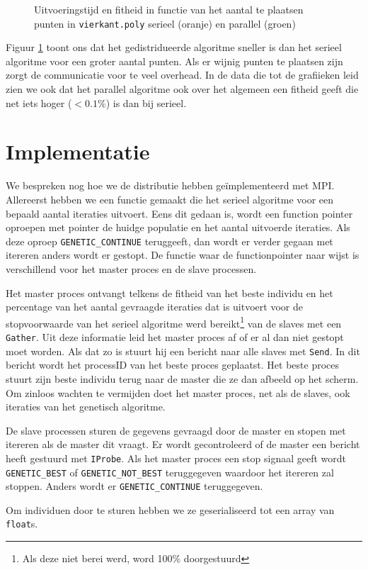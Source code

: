 \begin{figure}[H]

\caption{Uitvoeringstijd en fitheid in functie van het aantal te plaatsen punten in \texttt{vierkant.poly} serieel (oranje) en parallel (groen)}
\label{graf:perf}
\end{figure}

Figuur \ref{graf:perf} toont ons dat het gedistridueerde algoritme sneller is dan het serieel algoritme voor een groter aantal punten. Als er wijnig punten te plaatsen zijn zorgt de communicatie voor te veel overhead. In de data die tot de grafiieken leid zien we ook dat het parallel algoritme ook over het algemeen een fitheid geeft die net iets hoger ($< 0.1\%$) is dan bij serieel.


\section{Implementatie}
We bespreken nog hoe we de distributie hebben geïmplementeerd met MPI. Allereerst hebben we een functie gemaakt die het serieel algoritme voor een bepaald aantal iteraties uitvoert. Eens dit gedaan is, wordt een function pointer oproepen met pointer de huidge populatie en het aantal uitvoerde iteraties. Als deze oproep \texttt{GENETIC\_CONTINUE} teruggeeft, dan wordt er verder gegaan met itereren anders wordt er gestopt. De functie waar de functionpointer naar wijst is verschillend voor het master proces en de slave processen. 

Het master proces ontvangt telkens de fitheid van het beste individu en het percentage van het aantal gevraagde iteraties dat is uitvoert voor de stopvoorwaarde van het serieel algoritme werd bereikt\footnote{Als deze niet berei werd, word 100\% doorgestuurd} van de slaves met een \texttt{Gather}. Uit deze informatie leid het master proces af of er al dan niet gestopt moet worden. Als dat zo is stuurt hij een bericht naar alle slaves met \texttt{Send}. In dit bericht wordt het processID van het beste proces geplaatst. Het beste proces stuurt zijn beste individu terug naar de master die ze dan afbeeld op het scherm. Om zinloos wachten te vermijden doet het master proces, net als de slaves, ook iteraties van het genetisch algoritme.

De slave processen sturen de gegevens gevraagd door de master en stopen met itereren als de master dit vraagt. Er wordt gecontroleerd of de master een bericht heeft gestuurd met \texttt{IProbe}. Als het master proces een stop signaal geeft wordt \texttt{GENETIC\_BEST} of \texttt{GENETIC\_NOT\_BEST} teruggegeven waardoor het itereren zal stoppen. Anders wordt er \texttt{GENETIC\_CONTINUE} teruggegeven.

Om individuen door te sturen hebben we ze geserialiseerd tot een array van \texttt{float}s. 


%